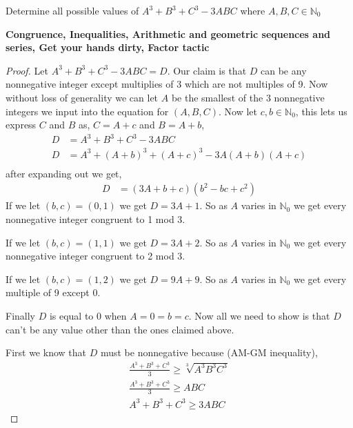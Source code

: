 \documentclass[11pt]{article}
\newenvironment{problem}[2][Problem\!]{\begin{trivlist}
\item[\hskip \labelsep {\bfseries #1}\hskip \labelsep {\bfseries #2}]}{\end{trivlist}}
\newcommand{\nn}{\mathbb N}   %
\renewcommand{\geq}{\geqslant}
\begin{document}
\begin{tcolorbox}
    \begin{problem} {IC | 11/29 | PP 28}
        Determine all possible values of $A^{3} + B^{3} + C^{3} - 3ABC$ where $A,B,C \in \nn_0$
    \end{problem}
    \textbf{Congruence, Inequalities, Arithmetic and geometric sequences and series, Get your hands dirty, Factor tactic}
\end{tcolorbox}
\begin{proof}
    Let $A^{3} + B^{3} + C^{3} -3ABC = D$. Our claim is that $D$ can be any nonnegative integer except multiplies of 3 which are not multiples of 9. Now without loss of generality we can let $A$ be the smallest of the 3 nonnegative integers we input into the equation for $(A,B,C)$. Now let $c,b \in \nn_0$, this lets us express $C$ and $B$ as, $C = A + c$ and $B = A + b$,
    \begin{align*}
        D &= A^{3} + B^{3} + C^{3} -3ABC  \\
        D &= A^{3} + (A+b)^{3} + (A + c)^{3} - 3A(A+b)(A+c)  \\
    \end{align*}
    after expanding out we get,
    \begin{align*}
        D &= (3A + b + c)(b^{2} -bc + c^{2}) 
    \end{align*}
    If we let $(b,c) = (0,1)$ we get $D = 3A + 1$. So as $A$ varies in $\nn_0$ we get every nonnegative integer congruent to 1 mod 3. 

    If we let $(b,c) = (1,1)$ we get $D = 3A + 2$. So as $A$ varies in $\nn_0$ we get every nonnegative integer congruent to 2 mod 3.

    If we let $(b,c) = (1,2)$ we get $D = 9A + 9$. So as $A$ varies in $\nn_0$ we get every multiple of 9 except 0. 

    Finally $D$ is equal to 0 when $A = 0 = b = c$. Now all we need to show is that $D$ can't be any value other than the ones claimed above. 

    First we know that $D$ must be nonnegative because (AM-GM inequality),
    \begin{align*}
        \frac{A^{3} + B^{3} + C^{3}}{3} \geq \sqrt[3]{A^{3}B^{3}C^{3}} \\
        \frac{A^{3} + B^{3} + C^{3}}{3} \geq  ABC \\
        A^{3} + B^{3} + C^{3} \geq 3ABC
    \end{align*}


\end{proof}
\end{document}
